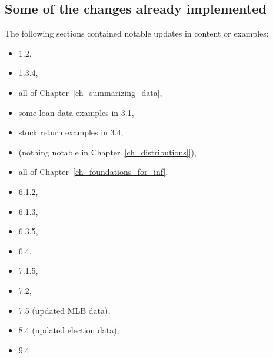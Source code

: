 \subsection*{Some of the changes already implemented}

\noindent%
The following sections contained notable updates
in content or examples:
\begin{itemize}
\item 1.2,
\item 1.3.4,
\item all of Chapter~\ref{ch_summarizing_data},
\item some loan data examples in 3.1,
\item stock return examples in 3.4,
\item (nothing notable in Chapter~\ref{ch_distributions}]),
\item all of Chapter~\ref{ch_foundations_for_inf},
\item 6.1.2,
\item 6.1.3,
\item 6.3.5,
\item 6.4,
\item 7.1.5,
\item 7.2,
\item 7.5 (updated MLB data),
\item 8.4 (updated election data),
\item 9.4
\end{itemize}


